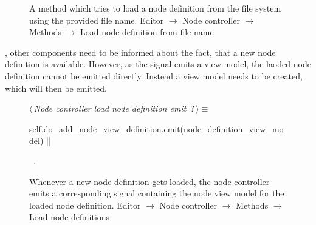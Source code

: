 \documentclass[%
    a4paper,    %
    justified,  %
    nobib,      %
    openany     %
]{tufte-book}
\makeatletter
\renewcommand{\label}[1]{\@tufte@label{##1}}%
\makeatother
\begin{document}
\begin{figure}
\begin{flushleft}
\begin{minipage}{\linewidth}
\begin{list}{}{\setlength{\itemsep}{-\parsep}\setlength{\itemindent}{-\leftmargin}}
\item{}
\end{list}
\end{minipage}\vspace{4ex}
\end{flushleft}
\caption{A method which tries to load a node definition from the
  file system using the provided file name.
  \newline{}\newline{}Editor $\rightarrow$ Node controller $\rightarrow$
  Methods $\rightarrow$ Load node definition from file name}
\label{editor:lst:node-controller:methods:load-node-definition-from-file-name}
\end{figure}

, other components need
to be informed about the fact, that a new node definition is available. However,
as the signal emits a view model, the laoded node definition cannot be emitted
directly. Instead a view model needs to be created, which will then be emitted.

\begin{figure}
\begin{flushleft} \small
\begin{minipage}{\linewidth}\label{scrap125}\raggedright\small
{} $\langle\,${\itshape Node controller load node definition emit}\nobreak\ {\footnotesize {?}}$\,\rangle\equiv$
\vspace{-1ex}
\begin{pythoncode}
self.do_add_node_view_definition.emit(node_definition_view_model)
|\NWsep|
\end{pythoncode}
\vspace{1.5ex}
\footnotesize
\begin{list}{}{\setlength{\itemsep}{-\parsep}\setlength{\itemindent}{-\leftmargin}}
\item \NWtxtMacroRefIn\ .

\item{}
\end{list}
\end{minipage}\vspace{4ex}
\end{flushleft}
\caption{Whenever a new node definition gets loaded, the node controller emits a
  corresponding signal containing the node view model for the loaded node definition.
  \newline{}\newline{}Editor $\rightarrow$ Node controller $\rightarrow$
  Methods $\rightarrow$ Load node definitions}
\label{editor:lst:node-controller:methods:load-node-definitions:do-add-node-view-definition}
\end{figure}
\end{document}
